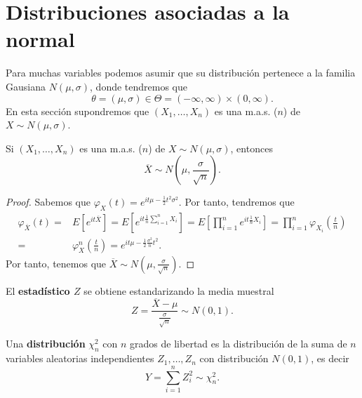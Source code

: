 \section{Distribuciones asociadas a la normal}
Para muchas variables podemos asumir que su distribución pertenece a la familia Gausiana $\displaystyle N\left(\mu, \sigma\right) $, donde tendremos que 
\[\theta = \left(\mu, \sigma\right) \in \Theta = \left(-\infty, \infty\right)\times \left(0, \infty\right) .\]
En esta sección supondremos que $\displaystyle \left(X_{1}, \ldots, X_{n}\right) $ es una m.a.s. ($\displaystyle n $) de $\displaystyle X \sim N\left(\mu, \sigma \right) $.
\begin{theorem}
Si $\displaystyle \left(X_{1}, \ldots, X_{n}\right) $ es una m.a.s. ($\displaystyle n $) de $\displaystyle X \sim N\left(\mu, \sigma\right) $, entonces
\[\overline{X} \sim N\left(\mu, \frac{\sigma}{\sqrt{n}}\right) .\]
\end{theorem}
\begin{proof}
Sabemos que $\displaystyle \varphi_{X}\left(t\right)=e^{it\mu-\frac{1}{2}t ^{2}\sigma^{2}} $. Por tanto, tendremos que 
\[
\begin{split}
	\varphi_{\overline{X}}\left(t\right) =& E\left[e^{it\overline{X}}\right] = E\left[e^{it\frac{1}{n}\sum^{n}_{i = 1}X_{i}}\right] = E\left[\prod^{n}_{i = 1}e^{it\frac{1}{n}X_{i}}\right] = \prod^{n}_{i = 1}\varphi_{X_{i}}\left(\frac{t}{n}\right)\\
	= & \varphi_{X}^{n}\left(\frac{t}{n}\right)= e^{it\mu - \frac{1}{2}\frac{\sigma^{2}}{n}t ^{2}}.
\end{split}
\]
Por tanto, tenemos que $\displaystyle \overline{X}\sim N\left(\mu, \frac{\sigma }{\sqrt{n}}\right) $. 
\end{proof}
\begin{definition}[Estadístico Z]
El \textbf{estadístico $\displaystyle Z $} se obtiene estandarizando la media muestral
\[Z = \frac{\overline{X}-\mu}{\frac{\sigma }{\sqrt{n}}}\sim N\left(0,1\right) .\]
\end{definition}
\begin{definition}
Una \textbf{distribución} $\displaystyle \chi_{n}^{2} $ con $\displaystyle n $ grados de libertad es la distribución de la suma de $\displaystyle n $ variables aleatorias independientes $\displaystyle Z_{1}, \ldots, Z_{n} $ con distribución $\displaystyle N\left(0,1\right) $, es decir
\[ Y = \sum^{n}_{i=1}Z^{2}_{i}\sim \chi_{n}^{2} .\]
\end{definition}
